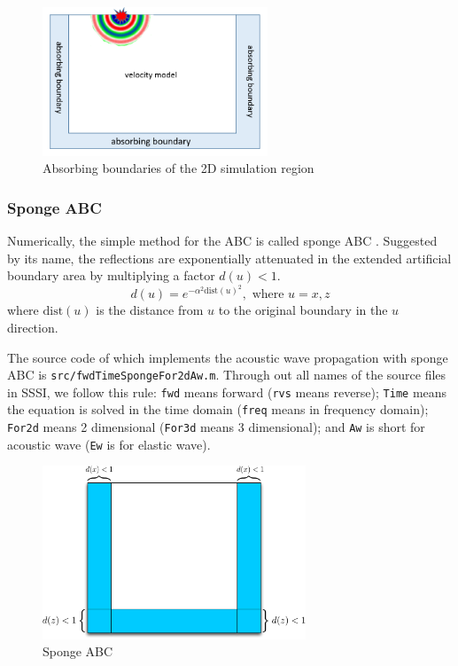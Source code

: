 \documentclass[12pt]{article}
\theoremstyle{plain}
\theoremstyle{definition}
\theoremstyle{remark}
\numberwithin{equation}{section}
\begin{document}
\begin{figure}
\centering
\includegraphics[width=0.6\textwidth]{Fig/abc.png}
\caption{Absorbing boundaries of the 2D simulation region}
\end{figure}

\subsubsection{Sponge ABC}
Numerically, the simple method for the ABC is called sponge ABC \cite{CerKosAO1985}. Suggested by its name, the reflections are exponentially attenuated in the extended artificial boundary area by multiplying a factor $d(u) < 1$.
\begin{equation}
  d(u) = e^{-\alpha^2\text{dist}(u)^2}, \mbox{  where  } u=x, z
\end{equation}
where $\text{dist}(u)$ is the distance from $u$ to the original boundary in the $u$ direction. 

The source code of which implements the acoustic wave propagation with sponge ABC 
is \texttt{src/fwdTimeSpongeFor2dAw.m}. Through out all names of the source files in SSSI,  we follow this rule: \texttt{fwd} means forward (\texttt{rvs} means reverse); \texttt{Time} means the equation is solved in the time domain (\texttt{freq} means in frequency domain); \texttt{For2d} means 2 dimensional (\texttt{For3d} means 3 dimensional); and \texttt{Aw} is short
 for acoustic wave (\texttt{Ew} is for elastic wave). 
 
\begin{figure}
\centering
\includegraphics[width=0.7\textwidth]{Fig/SpongeABC.pdf}
\caption{Sponge ABC}
\end{figure}
\end{document}
